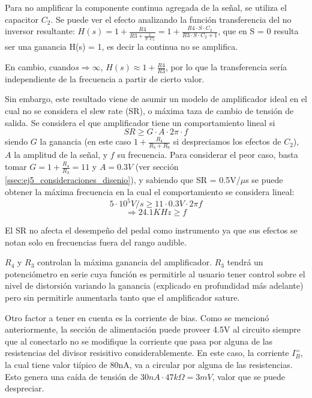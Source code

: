 \documentclass[../../main.tex]{subfiles}
\begin{document}
Para no amplificar la componente continua agregada de la señal, se utiliza el capacitor $C_2$. Se puede ver el efecto analizando la funci\'on transferencia del no inversor resultante: $H(s) = 1 + \frac{R4}{R3+\frac{1}{S\cdot C_2}} = 1 + \frac{R4\cdot S\cdot C_2}{R3\cdot S\cdot C_2+1}$, que en S = 0 resulta ser una ganancia H(s) = 1, es decir la continua no se amplifica. \par

En cambio, cuando$ s \Rightarrow \infty$,  $H(s) \approx 1 + \frac{R4}{R3}$, por lo que la transferencia sería independiente de la frecuencia a partir de cierto valor. \par

Sin embargo, este resultado viene de asumir un modelo de amplificador ideal en el cual no se considera el slew rate (SR), o máxima taza de cambio de tensi\'on de salida.
Se considera el que amplificador tiene un comportamiento lineal si \[SR \geqslant G\cdot A\cdot 2\pi\cdot f\] siendo $G$ la ganancia (en este caso $1+\frac{R_4}{R_3+R_9}$ si despreciamos los efectos de $C_2$), $A$ la amplitud de la se\~nal, y $f$ su frecuencia. Para considerar el peor caso, basta tomar $G = 1+\frac{R_4}{R_3}=11$ y $A=0.3V$ (ver secci\'on \ref{ssec:ej5_consideraciones_disenio}), y sabiendo que SR = 0.5V/$\mu$s se puede obtener la m\'axima frecuencia en la cual el comportamiento se considera lineal:
\[5\cdot 10^5 V/s\geqslant 11\cdot 0.3V \cdot 2\pi f\]
\[\Rightarrow 24.1KHz \geqslant f\]

El SR no afecta el desempe\~no del pedal como instrumento ya que sus efectos se notan solo en frecuencias fuera del rango audible.

$R_4$ y $R_3$ controlan la m\'axima ganancia del amplificador. $R_3$ tendrá un potenciómetro en serie cuya funci\'on es permitirle al usuario tener control sobre el nivel de distorsi\'on variando la ganancia (explicado en profundidad más adelante) pero sin permitirle aumentarla tanto que el amplificador sature. \par

Otro factor a tener en cuenta es la corriente de bias. Como se mencion\'o anteriormente, la secci\'on de alimentaci\'on puede proveer 4.5V al circuito siempre que al conectarlo no se modifique la corriente que pasa por alguna de las resistencias del divisor resisitivo considerablemente. En este caso, la corriente $I_B^=$, la cual tiene valor ti\'ipico de 80nA, va a circular por alguna de las resistencias. Esto genera una ca\'ida de tensi\'on de $30nA\cdot 47k\Omega = 3mV$, valor que se puede despreciar.\par
\end{document}
